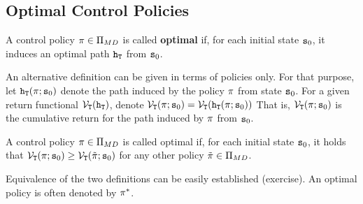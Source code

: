 \subsection{Optimal Control Policies}

\begin{definition}
A control policy $\pi\in\Pi_{MD} $ is called \textbf{optimal}
if, for each initial state ${{\tt s}_0}$, it induces an optimal path
${{\tt h}_{\tt T}}$ from ${{\tt s}_0}$.
\end{definition}

An alternative definition can be given in terms of policies only.
For that purpose, let ${{\tt h}_{\tt T}}(\pi ;{{\tt s}_0})$
denote the path induced by the policy $\pi $ from state ${{\tt s}_0}$.
For a given return functional
${\mathcal{V}_{\tt T}}({{\tt h}_{\tt T}})$, denote
${\mathcal{V}_{\tt T}}(\pi ;{{\tt s}_0}) =
{\mathcal{V}_{\tt T}}({{\tt h}_{\tt T}}(\pi ;{{\tt s}_0}))$ That
is, ${\mathcal{V}_{\tt T}}(\pi ;{{\tt s}_0})$ is the cumulative
return for the path induced by $\pi $ from ${{\tt s}_0}$.

\begin{definition}
A control policy $\pi \in\Pi_{MD}$ is called optimal if, for
each initial state ${{\tt s}_0}$, it holds that
${\mathcal{V}_{\tt T}}(\pi ;{{\tt s}_0}) \ge
{\mathcal{V}_{\tt T}}(\tilde {\pi} ;{{\tt s}_0})$ for any other policy
$\tilde {\pi} \in\Pi_{MD}$.
\end{definition}

Equivalence of the two definitions can be easily established
(exercise). An optimal policy is often denoted by ${\pi ^*}$.

\vspace{10pt} 


\normalsize
